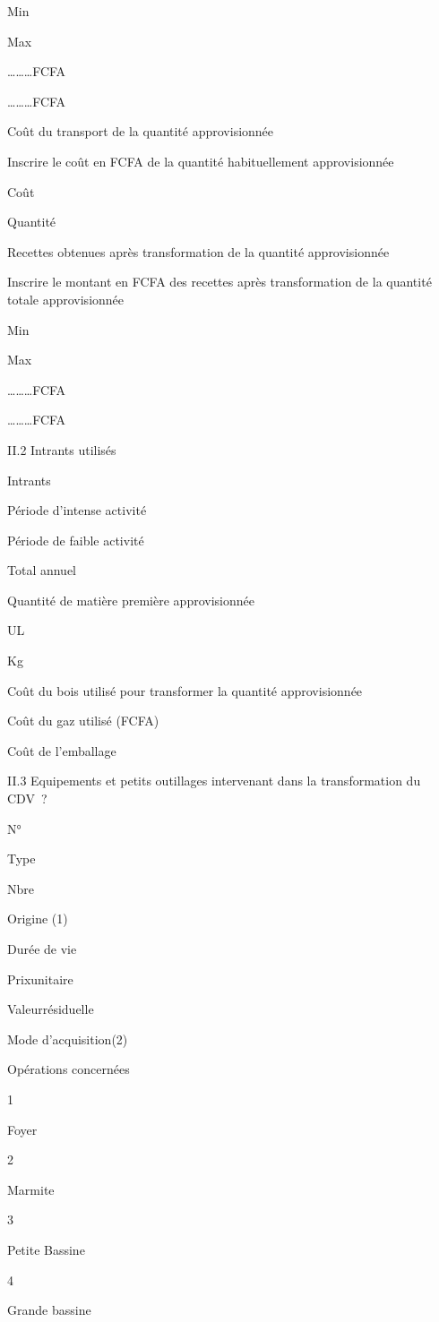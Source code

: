 \documentclass[12pt,oneside]{report}
\begin{document}
Min

Max

………FCFA

………FCFA

Coût du transport de la quantité approvisionnée

Inscrire le coût en FCFA de la quantité habituellement approvisionnée

Coût

Quantité

Recettes obtenues après transformation de la quantité approvisionnée

Inscrire le montant en FCFA des recettes après transformation de la quantité totale approvisionnée

Min

Max

………FCFA

………FCFA

II.2 Intrants utilisés

Intrants

Période d’intense activité

Période de faible activité

Total annuel

Quantité de matière première approvisionnée

UL

Kg

Coût du bois utilisé pour transformer la quantité approvisionnée

Coût du gaz utilisé (FCFA)

Coût de l’emballage

II.3 Equipements et petits outillages intervenant dans la transformation du CDV ?

N°

Type

Nbre

Origine (1)

Durée de vie

Prixunitaire

Valeurrésiduelle

Mode d’acquisition(2)

Opérations concernées

1

Foyer

2

Marmite

3

Petite Bassine

4

Grande bassine
\end{document}
